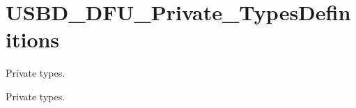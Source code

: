 \hypertarget{group__USBD__DFU__Private__TypesDefinitions}{}\section{U\+S\+B\+D\+\_\+\+D\+F\+U\+\_\+\+Private\+\_\+\+Types\+Definitions}
\label{group__USBD__DFU__Private__TypesDefinitions}


Private types.  


Private types. 

